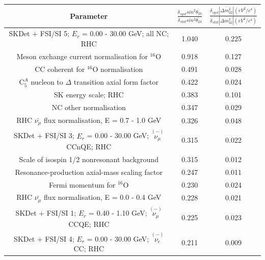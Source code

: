 \begin{table}
\small
\centering
\begin{tabular}{| c | c | c |}
\hline
 Parameter               &  $\frac{\delta_{syst} sin^2\overline{\theta_{23}}}{\delta_{stat} sin^2\overline{\theta_{23}}}$   &  $\frac{\delta_{syst}|\overline{\Delta m^2_{32}}| (eV^{2}/c^{4})}{\delta_{stat} |\overline{\Delta m^2_{32}}| (eV^{2}/c^{4})}$ \\
\hline
                               SKDet + FSI/SI  5; $E_r$ =  0.00 - 30.00 GeV; all NC; RHC & 1.040 & 0.225 \\ \hline 
                                       Meson exchange current normalisation for $^{16}$O & 0.918 & 0.127 \\ \hline 
                                                  CC coherent for $^{16}$O normalisation & 0.491 & 0.028 \\ \hline 
                            C$^{A}_{5}$ nucleon to $\Delta$ transition axial form factor & 0.422 & 0.024 \\ \hline 
                                                                    SK energy scale; RHC & 0.383 & 0.101 \\ \hline 
                                                                  NC other normalisation & 0.347 & 0.029 \\ \hline 
                               RHC $\bar{\nu_\mu}$ flux normalisation, E = 0.7 - 1.0 GeV & 0.326 & 0.048 \\ \hline 
       SKDet + FSI/SI  3; $E_r$ =  0.00 - 30.00 GeV; $\overset{(-)}{\nu_\mu}$ CCnQE; RHC & 0.315 & 0.022 \\ \hline 
                                             Scale of isospin 1/2 nonresonant background & 0.315 & 0.012 \\ \hline 
                                          Resonance-production axial-mass scaling factor & 0.247 & 0.011 \\ \hline 
                                                             Fermi momentum for $^{16}$O & 0.230 & 0.024 \\ \hline 
                               RHC $\bar{\nu_\mu}$ flux normalisation, E = 0.0 - 0.4 GeV & 0.228 & 0.021 \\ \hline 
         SKDet + FSI/SI  1; $E_r$ =  0.40 - 1.10 GeV; $\overset{(-)}{\nu_\mu}$ CCQE; RHC & 0.225 & 0.023 \\ \hline 
            SKDet + FSI/SI  4; $E_r$ =  0.00 - 30.00 GeV; $\overset{(-)}{\nu_e}$ CC; RHC & 0.211 & 0.009 \\ \hline 

\end{tabular}
\end{table}
